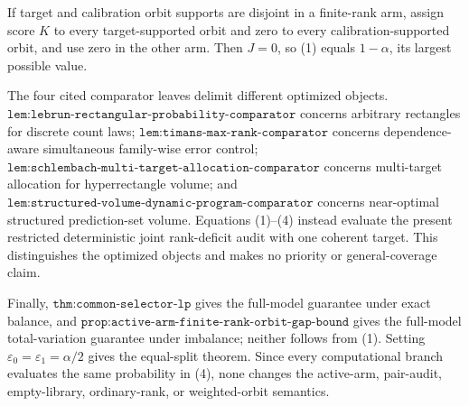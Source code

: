 If target and calibration orbit supports are disjoint in a finite-rank arm, assign score \(K\) to every target-supported orbit and zero to every calibration-supported orbit, and use zero in the other arm. Then \(J=0\), so (1) equals \(1-\alpha\), its largest possible value.

The four cited comparator leaves delimit different optimized objects. \(\texttt{lem:lebrun-rectangular-probability-comparator}\) concerns arbitrary rectangles for discrete count laws; \(\texttt{lem:timans-max-rank-comparator}\) concerns dependence-aware simultaneous family-wise error control; \(\texttt{lem:schlembach-multi-target-allocation-comparator}\) concerns multi-target allocation for hyperrectangle volume; and \(\texttt{lem:structured-volume-dynamic-program-comparator}\) concerns near-optimal structured prediction-set volume. Equations (1)--(4) instead evaluate the present restricted deterministic joint rank-deficit audit with one coherent target. This distinguishes the optimized objects and makes no priority or general-coverage claim.

Finally, \(\texttt{thm:common-selector-lp}\) gives the full-model guarantee under exact balance, and \(\texttt{prop:active-arm-finite-rank-orbit-gap-bound}\) gives the full-model total-variation guarantee under imbalance; neither follows from (1). Setting \(\varepsilon_0=\varepsilon_1=\alpha/2\) gives the equal-split theorem. Since every computational branch evaluates the same probability in (4), none changes the active-arm, pair-audit, empty-library, ordinary-rank, or weighted-orbit semantics.